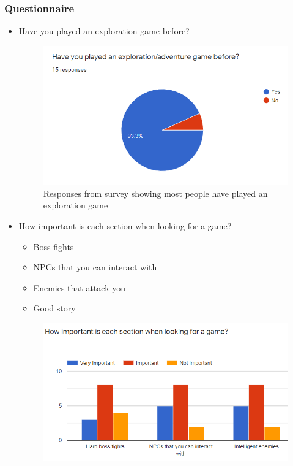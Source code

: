\documentclass{article}
\begin{document}
            \subsubsection{Questionnaire}
                \begin{itemize}
                    \item Have you played an exploration game before?
                    \begin{figure}[hbt!]
                        \centerline{\includegraphics[scale=1]{img/Survey/Played Exploration Game.PNG}}
                        \caption{Responses from survey showing most people have played an exploration game}
                        \label{fig}
                    \end{figure}
                    \clearpage
                    \item How important is each section when looking for a game?
                    \begin{itemize}
                        \item Boss fights
                        \item NPCs that you can interact with
                        \item Enemies that attack you
                        \item Good story
                    \end{itemize}
                    \begin{figure}[hbt!]
                        \centerline{\includegraphics[scale=1]{img/Survey/Importance of games.PNG}}

\end{figure}
\end{itemize}
\end{document}
